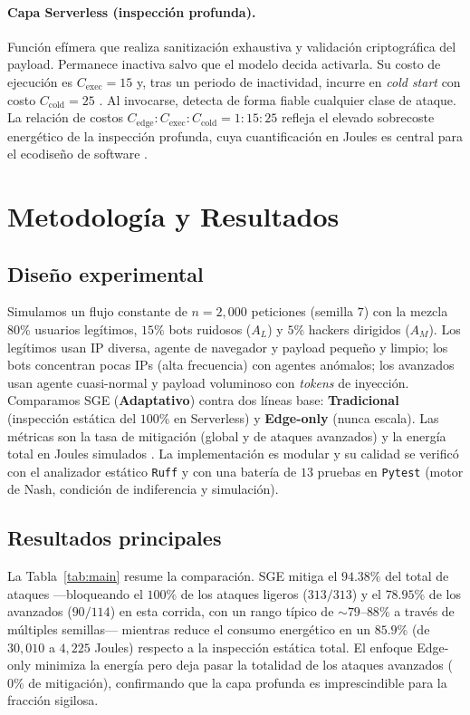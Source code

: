 \documentclass[10pt,twocolumn]{article}
\begin{document}
\paragraph{Capa Serverless (inspecci\'on profunda).} Funci\'on ef\'imera que realiza
sanitizaci\'on exhaustiva y validaci\'on criptogr\'afica del payload. Permanece
inactiva salvo que el modelo decida activarla. Su costo de ejecuci\'on es
$C_{\text{exec}}=15$ y, tras un periodo de inactividad, incurre en \emph{cold start}
con costo $C_{\text{cold}}=25$ \cite{castro}. Al invocarse, detecta de forma fiable
cualquier clase de ataque. La relaci\'on de costos
$C_{\text{edge}}:C_{\text{exec}}:C_{\text{cold}} = 1:15:25$ refleja el elevado
sobrecoste energ\'etico de la inspecci\'on profunda, cuya cuantificaci\'on en Joules
es central para el ecodise\~no de software \cite{murugesan,radu}.

\section{Metodolog\'ia y Resultados}
\label{sec:results}
\subsection{Dise\~no experimental}
Simulamos un flujo constante de $n=2{,}000$ peticiones (semilla $7$) con la mezcla
$80\%$ usuarios leg\'itimos, $15\%$ bots ruidosos ($A_L$) y $5\%$ hackers dirigidos
($A_M$). Los leg\'itimos usan IP diversa, agente de navegador y payload peque\~no y
limpio; los bots concentran pocas IPs (alta frecuencia) con agentes an\'omalos; los
avanzados usan agente cuasi-normal y payload voluminoso con \emph{tokens} de
inyecci\'on. Comparamos SGE (\textbf{Adaptativo}) contra dos l\'ineas base:
\textbf{Tradicional} (inspecci\'on est\'atica del $100\%$ en Serverless) y
\textbf{Edge-only} (nunca escala). Las m\'etricas son la tasa de mitigaci\'on
(global y de ataques avanzados) y la energ\'ia total en Joules simulados
\cite{murugesan}. La implementaci\'on es modular y su calidad se verific\'o con el
analizador est\'atico \texttt{Ruff} y con una bater\'ia de $13$ pruebas en
\texttt{Pytest} (motor de Nash, condici\'on de indiferencia y simulaci\'on).

\subsection{Resultados principales}
La Tabla~\ref{tab:main} resume la comparaci\'on. SGE mitiga el $\mathbf{94.38\%}$ del
total de ataques ---bloqueando el $100\%$ de los ataques ligeros ($313/313$) y el
$78.95\%$ de los avanzados ($90/114$) en esta corrida, con un rango t\'ipico de
$\sim\!79$--$88\%$ a trav\'es de m\'ultiples semillas--- mientras reduce el consumo
energ\'etico en un $\mathbf{85.9\%}$ (de $30{,}010$ a $4{,}225$ Joules) respecto a la
inspecci\'on est\'atica total. El enfoque Edge-only minimiza la energ\'ia pero deja
pasar la totalidad de los ataques avanzados ($0\%$ de mitigaci\'on), confirmando que
la capa profunda es imprescindible para la fracci\'on sigilosa.
\end{document}
